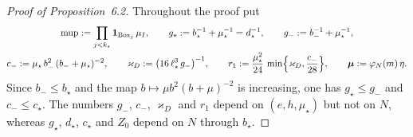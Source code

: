 \documentclass[11pt,letterpaper,reqno]{amsart}
\theoremstyle{definition}
\begin{document}
\begin{proof}[Proof of Proposition~6.2]
Throughout the proof put
\begin{gather*}
\mathrm{mup}:=\prod_{j<k_\star}\mathbf 1_{\mathrm{Box}_j}\,\mu_I,\qquad g_\star:=b_\star^{-1}+\mu_\star^{-1}=d_\star^{-1},\qquad g_-:=b_-^{-1}+\mu_\star^{-1},\\
c_-:=\mu_\star\,b_-^2\,(b_-+\mu_\star)^{-2},\qquad\varkappa_D:=\bigl(16\,\ell_\star^3\,g_-\bigr)^{-1},\qquad r_1:=\frac{\mu_\star^2}{24}\,\min\Bigl\{\varkappa_D,\frac{c_-}{28}\Bigr\},\qquad\boldsymbol\mu:=\varphi_N(m)\,\eta .
\end{gather*}
Since $b_-\le b_\star$ and the map $b\mapsto\mu b^2(b+\mu)^{-2}$ is increasing, one has $g_\star\le g_-$ and $c_-\le c_\star$.
The numbers $g_-$, $c_-$, $\varkappa_D$ and $r_1$ depend on $(e,h,\mu_\star)$ but not on $N$, whereas $g_\star$, $d_\star$, $c_\star$ and $Z_0$ depend on $N$ through $b_\star$.


\end{proof}
\end{document}
